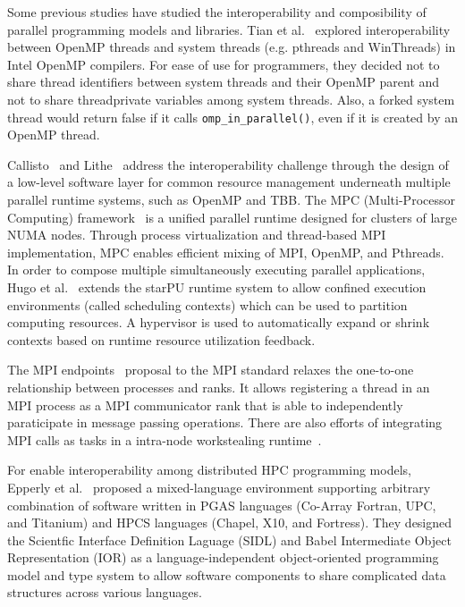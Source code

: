 Some previous studies have studied the interoperability and composibility of parallel programming models and libraries. 
Tian et al.~\cite{tian2003compiler} explored interoperability between OpenMP threads and system threads (e.g. pthreads and WinThreads) in Intel OpenMP compilers.
For ease of use for programmers, they decided not to share thread identifiers between system threads and their OpenMP parent
and not to share threadprivate variables among system threads.
Also, a forked system thread would return false if it calls \lstinline{omp_in_parallel()}, even if it is created by an OpenMP thread. 

Callisto~\cite{Callisto:Harris:2014:CCP:2592798.2592807} and
Lithe~\cite{Lithe:Pan:2009:LEE:1855591.1855602} 
address the interoperability challenge 
through the design of a low-level software layer for common 
resource management underneath multiple parallel runtime systems, such as OpenMP and TBB. %
The MPC (Multi-Processor Computing) framework~\cite{perache2008mpc} is a unified parallel runtime designed for clusters of large NUMA nodes. 
Through process virtualization and thread-based MPI implementation, MPC enables efficient mixing of MPI, OpenMP, and Pthreads. 
In order to compose multiple simultaneously executing parallel applications, Hugo et al.~\cite{hugo2014composing} extends the starPU runtime system to allow confined execution environments (called scheduling contexts) which can be used to partition computing resources. 
A hypervisor is used to automatically expand or shrink contexts based on runtime resource utilization feedback. 

The MPI endpoints~\cite{Dinan:mpiendpoint_eurompi13}
proposal to the MPI standard relaxes the one-to-one relationship between processes and ranks.
It allows registering a thread in an MPI
process as a MPI communicator rank that is able to independently paraticipate
in message passing operations. There are also efforts of integrating MPI calls as
tasks in a intra-node workstealing runtime~\cite{hcmpi:ipdps13}.

For enable interoperability among distributed HPC programming models, Epperly et al.~\cite{epperly2011composite} proposed a mixed-language environment supporting arbitrary combination of software written in PGAS languages (Co-Array Fortran, UPC, and Titanium) and HPCS languages (Chapel, X10, and Fortress). 
They designed the Scientfic Interface Definition Laguage (SIDL) and Babel Intermediate Object Representation (IOR) as a language-independent object-oriented programming model and type system
to allow software components to share complicated data structures across various languages. 

